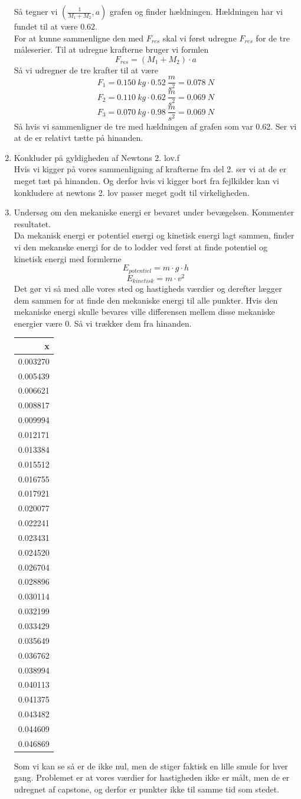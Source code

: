 \begin{enumerate}
  Så tegner vi \((\frac{1}{M_1+M_2}, a)\) grafen og finder hældningen.
  Hældningen har vi fundet til at være 0.62.\\
  For at kunne sammenligne den med \(F_{res}\) skal vi først udregne
  \(F_{res}\) for de tre måleserier. Til at udregne krafterne bruger vi
  formlen\\
  \[F_{res}=(M_1+M_2) \cdot a\] Så vi udregner de tre krafter til at
  være\\
  \[F_{1}=0.150 \ kg \cdot 0.52 \ \frac{m}{s^2}=0.078 \ N\]
  \[F_{2}=0.110 \ kg \cdot 0.62 \ \frac{m}{s^2}=0.069 \ N\]
  \[F_{3}=0.070 \ kg \cdot 0.98 \ \frac{m}{s^2}=0.069 \ N\] Så hvis vi
  sammenligner de tre med hældningen af grafen som var 0.62. Ser vi at
  de er relativt tætte på hinanden.
\item
  Konkluder på gyldigheden af Newtons 2. lov.f\\
  Hvis vi kigger på vores sammenligning af krafterne fra del 2. ser vi
  at de er meget tæt på hinanden. Og derfor hvis vi kigger bort fra
  fejlkilder kan vi konkludere at newtons 2. lov passer meget godt til
  virkeligheden.
\item
  Undersøg om den mekaniske energi er bevaret under bevægelsen.
  Kommenter resultatet.\\
  Da mekanisk energi er potentiel energi og kinetisk energi lagt sammen,
  finder vi den mekanske energi for de to lodder ved først at finde
  potentiel og kinetisk energi med formlerne\\
  \[E_{potentiel}=m \cdot g \cdot h\] \[E_{kinetisk} = m \cdot v^2\] Det
  gør vi så med alle vores sted og hastigheds værdier og derefter lægger
  dem sammen for at finde den mekaniske energi til alle punkter. Hvis
  den mekaniske energi skulle bevares ville differensen mellem disse
  mekaniske energier være 0. Så vi trækker dem fra hinanden.

  \begin{longtable}[]{@{}r@{}}
  \toprule
  x\tabularnewline
  \midrule
  \endhead
  0.003270\tabularnewline
  0.005439\tabularnewline
  0.006621\tabularnewline
  0.008817\tabularnewline
  0.009994\tabularnewline
  0.012171\tabularnewline
  0.013384\tabularnewline
  0.015512\tabularnewline
  0.016755\tabularnewline
  0.017921\tabularnewline
  0.020077\tabularnewline
  0.022241\tabularnewline
  0.023431\tabularnewline
  0.024520\tabularnewline
  0.026704\tabularnewline
  0.028896\tabularnewline
  0.030114\tabularnewline
  0.032199\tabularnewline
  0.033429\tabularnewline
  0.035649\tabularnewline
  0.036762\tabularnewline
  0.038994\tabularnewline
  0.040113\tabularnewline
  0.041375\tabularnewline
  0.043482\tabularnewline
  0.044609\tabularnewline
  0.046869\tabularnewline
  \bottomrule
  \end{longtable}

  Som vi kan se så er de ikke nul, men de stiger faktisk en lille smule
  for hver gang. Problemet er at vores værdier for hastigheden ikke er
  målt, men de er udregnet af capstone, og derfor er punkter ikke til
  samme tid som stedet.
\end{enumerate}

